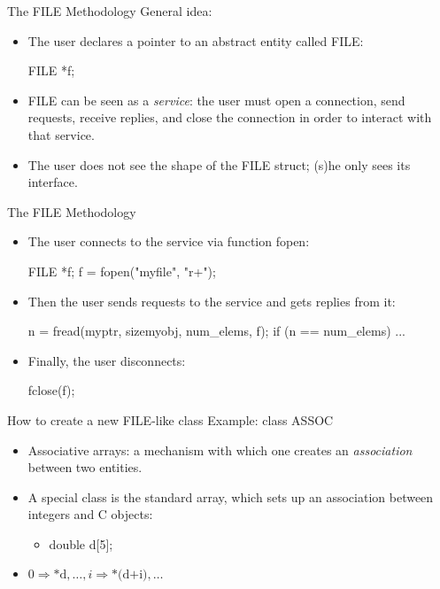 \begin{frame}[fragile]{The FILE Methodology}
General idea:
\begin{itemize}
\item The user declares a pointer to an abstract entity called FILE:
\begin{center}
	FILE *f;
\end{center}
\item FILE can be seen as a \emph{service}: the user must
open a connection, send requests, receive replies, and close the
connection in order to interact with that service.
\item The user does not see the shape of the FILE struct; (s)he only
sees its interface.
\end{itemize}

\end{frame}
\begin{frame}[fragile]{The FILE Methodology}
\begin{itemize}
\item The user connects to the service via function fopen:
\begin{center}
	FILE *f; f = fopen("myfile", "r+");
\end{center}
\item Then the user sends requests to the service and gets replies
from it:
\begin{center}
	n = fread(myptr, sizemyobj, num\_elems, f);
	if (n == num\_elems) ...
\end{center}
\item Finally, the user disconnects:
\begin{center}
	fclose(f);
\end{center}
\end{itemize}

\end{frame}
\begin{frame}[fragile]{How to create a new FILE-like class}
Example: class ASSOC
\begin{itemize}
\item Associative arrays: a mechanism with which one creates
an \emph{association\/} between two entities.
\item A special class is the standard array, which sets up an
association between integers and C objects:
\begin{itemize}
\item double d[5];
\end{itemize}
\item $0\Rightarrow\mbox{*d}, \dots, i\Rightarrow\mbox{*(d+i)}, \dots$
\end{itemize}

\end{frame}
